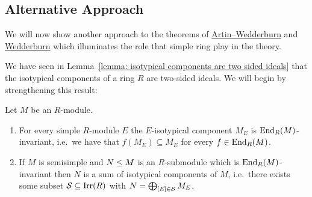 \subsection{Alternative Approach}


\begin{fluff}
  We will now show another approach to the theorems of \hyperref[theorem: artin wedderburn theorem]{Artin--Wedderburn} and \hyperref[theorem: wedderburns theorem]{Wedderburn} which illuminates the role that simple ring play in the theory.
  
  We have seen in Lemma~\ref{lemma: isotypical components are two sided ideals} that the isotypical components of a ring $R$ are two-sided ideals.
  We will begin by strengthening this result:
\end{fluff}


\begin{lemma}
  \label{lemma: submodules which are End invariant}
  Let $M$ be an $R$-module.
  \begin{enumerate}
    \item
      For every simple $R$-module $E$ the $E$-isotypical component $M_E$ is $\operatorname{End}_R(M)$-in\-vari\-ant, i.e.\ we have that $f(M_E) \subseteq M_E$ for every $f \in \operatorname{End}_R(M)$.
    \item
      If $M$ is semisimple and $N \leq M$ is an $R$-submodule which is $\operatorname{End}_R(M)$-invariant then $N$ is a sum of isotypical components of $M$, i.e.\ there exists some subset $\mathcal{S} \subseteq \operatorname{Irr}(R)$ with $N = \bigoplus_{[E] \in \mathcal{S}} M_E$.
  \end{enumerate}
\end{lemma}


